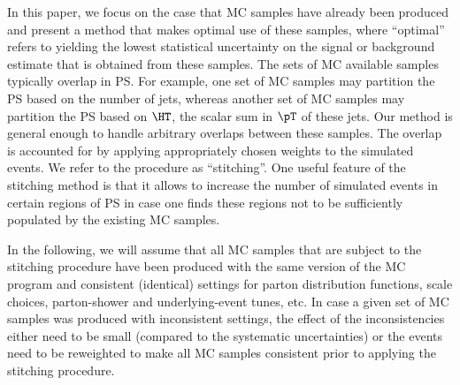 In this paper, we focus on the case that MC samples have already been produced and present a method that makes optimal use of these samples,
where ``optimal'' refers to yielding the lowest statistical uncertainty on the signal or background estimate that is obtained from these samples.
The sets of MC available samples typically overlap in PS.
For example, one set of MC samples may partition the PS based on the number of jets, 
whereas another set of MC samples may partition the PS based on $\HT$, the scalar sum in $\pT$ of these jets.
Our method is general enough to handle arbitrary overlaps between these samples.
The overlap is accounted for by applying appropriately chosen weights to the simulated events.
We refer to the procedure as ``stitching''.
One useful feature of the stitching method is that it allows to increase the number of simulated events in certain regions of PS
in case one finds these regions not to be sufficiently populated by the existing MC samples.

In the following, we will assume that all MC samples that are subject to the stitching procedure 
have been produced with the same version of the MC program and consistent (\ie identical) settings 
for parton distribution functions, scale choices, parton-shower and underlying-event tunes, etc.
In case a given set of MC samples was produced with inconsistent settings,
the effect of the inconsistencies either need to be small (compared to \eg the systematic uncertainties) or the events need to be reweighted
to make all MC samples consistent prior to applying the stitching procedure.

